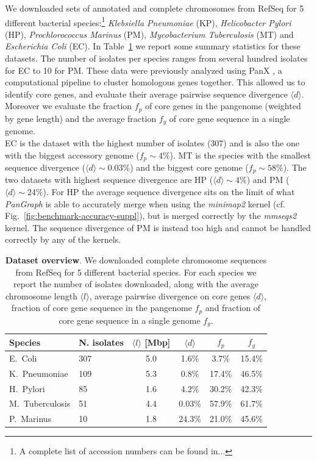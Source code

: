 \documentclass[aps,rmp,reprint,superscriptaddress,notitlepage,10pt,onecolumn]{revtex4-1}
\newcommand{\avg}[1]{\langle #1 \rangle}
\begin{document}
We downloaded sets of annotated and complete chromosomes from RefSeq \cite{o2016reference} for 5 different bacterial species:\footnote{A complete list of accession numbers can be found in...} \textit{Klebsiella Pneumoniae} (KP), \textit{Helicobacter Pylori} (HP), \textit{Prochlorococcus Marinus} (PM), \textit{Mycobacterium Tuberculosis} (MT) and \textit{Escherichia Coli} (EC). In Table~\ref{table:panx-dataset} we report some summary statistics for these datasets. The number of isolates per species ranges from several hundred isolates for EC to 10 for PM.
These data were previously analyzed using PanX \cite{ding2018panx}, a computational pipeline to cluster homologous genes together. This allowed us to identify core genes, and evaluate their average pairwise sequence divergence $\avg{d}$. Moreover we evaluate the fraction $f_p$ of core genes in the pangenome (weighted by gene length) and the average fraction $f_g$ of core gene sequence in a single genome.\\
EC is the dataset with the highest number of isolates (307) and is also the one with the biggest accessory genome ($f_p \sim 4\%$). MT is the species with the smallest sequence divergence ($\avg{d} \sim 0.03\%$) and the biggest core genome ($f_p \sim 58\%$). The two datasets with highest sequence divergence are HP ($\avg{d} \sim 4\%$) and PM ($\avg{d} \sim 24\%$). For HP the average sequence divergence sits on the limit of what \textit{PanGraph} is able to accurately merge when using the \textit{minimap2} kernel (cf. Fig.~\ref{fig:benchmark-accuracy-suppl}), but is merged correctly by the \textit{mmseqs2} kernel. The sequence divergence of PM is instead too high and cannot be handled correctly by any of the kernels. 

\begin{table}[hb]
    \setlength{\tabcolsep}{9pt}
    \begin{tabular}{l l c c c c}
        \hline\hline
        Species         & N. isolates & $\avg{l}$ [Mbp] & $\avg{d}$ & $f_p$  & $f_g$  \\
        \hline
        E.~Coli         & 307         & 5.0             & 1.6\%     & 3.7\%  & 15.4\% \\
        K.~Pneumoniae   & 109         & 5.3             & 0.8\%     & 17.4\% & 46.5\% \\
        H.~Pylori       & 85          & 1.6             & 4.2\%     & 30.2\% & 42.3\% \\
        M.~Tuberculosis & 51          & 4.4             & 0.03\%    & 57.9\% & 61.7\% \\
        P.~Marinus      & 10          & 1.8             & 24.3\%    & 21.0\% & 45.6\% \\
        \hline
    \end{tabular}
    \caption{{\bf Dataset overview}. We downloaded complete chromosome sequences from RefSeq for 5 different bacterial species. For each species we report the number of isolates downloaded, along with the average chromosome length $\avg{l}$, average pairwise divergence on core genes $\avg{d}$, fraction of core gene sequence in the pangenome $f_p$ and fraction of core gene sequence in a single genome $f_g$.}
    \label{table:panx-dataset}
\end{table}
\end{document}
